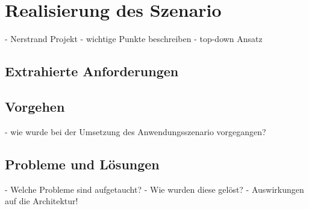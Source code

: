 

\section{Realisierung des Szenario} %
\label{sec:realisierung_des_szenario}

  - Nerstrand Projekt
  - wichtige Punkte beschreiben
  - top-down Ansatz

\subsection{Extrahierte Anforderungen} %
\label{sub:extrahierte_anforderungen}


\subsection{Vorgehen} %
\label{sub:vorgehen_szenario}

  - wie wurde bei der Umsetzung des Anwendungsszenario vorgegangen?


\subsection{Probleme und Lösungen} %
\label{sub:probleme_und_loesungen_szenario}

  - Welche Probleme sind aufgetaucht?
  - Wie wurden diese gelöst?
  - Auswirkungen auf die Architektur!



